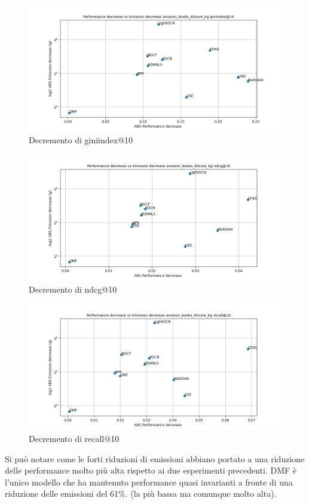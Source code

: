 \begin{figure}[H]
    \centering
     \includegraphics[width=\textwidth]{images/decrement_giniindex@10_amazon_books_60core_kg.png}
    \caption{Decremento di giniindex@10}
\end{figure}

\begin{figure}[H]
    \centering
     \includegraphics[width=\textwidth]{images/decrement_ndcg@10_amazon_books_60core_kg.png}
    \caption{Decremento di ndcg@10}
\end{figure}

\begin{figure}[H]
    \centering
     \includegraphics[width=\textwidth]{images/decrement_recall@10_amazon_books_60core_kg.png}
    \caption{Decremento di recall@10}
\end{figure}
\noindent Si può notare come le forti riduzioni di emissioni abbiano portato a una riduzione delle performance molto più alta rispetto ai due esperimenti precedenti.
DMF è l'unico modello che ha mantenuto performance quasi invarianti a fronte di una riduzione delle emissioni del 61\%. (la più bassa ma comunque molto alta).

